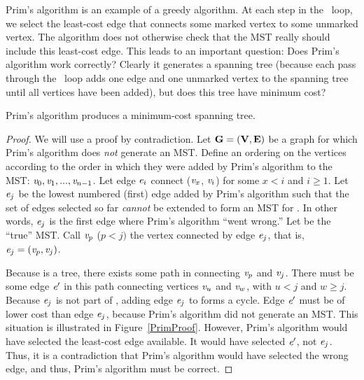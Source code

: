 Prim's algorithm is an example of a greedy
algorithm.
At each step in the \Cfor\ loop, we select the least-cost edge that
connects some marked vertex to some unmarked vertex.
The algorithm does not otherwise check that the MST really should
include this least-cost edge.
This leads to an important question:
Does Prim's algorithm work correctly?
Clearly it generates a spanning tree (because each pass through the
\Cfor\ loop adds one edge and one unmarked vertex to the spanning tree
until all vertices have been added), but does this tree have minimum
cost?

\begin{theorem}
Prim's algorithm produces a minimum-cost spanning tree.
\end{theorem}

\vspace{-\medskipamount}
\begin{proof}
We will use a proof by contradiction.
Let \({\textbf{G}} = ({\textbf{V}}, {\textbf{E}})\) be a graph for which Prim's
algorithm does \emph{not} generate an MST.
Define an ordering on the vertices according to the order in which they
were added by Prim's algorithm to the MST: \({\textit{v}}_0, {\textit{v}}_1,
..., {\textit{v}}_{n-1}\). 
Let edge \({\textit{e}}_i\) connect (\({\textit{v}}_x\), \({\textit{v}}_i\)) for
some \(x < i\) and \(i \geq 1\).
Let \({\textit{e}}_j\) be the lowest numbered (first) edge added
by Prim's algorithm such that the set of edges selected so
far \emph{cannot} be extended to form an MST for .
In other words, \({\textit{e}}_j\) is the first edge where Prim's algorithm
``went wrong.''
Let  be the ``true'' MST.
Call \({\textit{v}}_p\) (\(p<j)\) the vertex connected by edge
\({\textit{e}}_j\), that is, \({\textit{e}}_j = ({\textit{v}}_p, {\textit{v}}_j)\).

Because  is a tree, there exists some path in 
connecting \({\textit{v}}_p\) and \({\textit{v}}_j\).
There must be some edge \({\textit{e}}'\) in this path connecting vertices
\({\textit{v}}_u\) and \({\textit{v}}_w\), with \(u < j\) and \(w \geq j\).
Because \({\textit{e}}_j\) is not part of , adding edge
\({\textit{e}}_j\) to  forms a cycle.
Edge \({\textit{e}}'\) must be of lower cost than
edge \({\textit{e}}_j\), because Prim's algorithm did not generate an MST.
This situation is illustrated in Figure~\ref{PrimProof}.
However, Prim's algorithm would have selected the least-cost edge
available.
It would have selected \({\textit{e}}'\), not \({\textit{e}}_j\).
Thus, it is a contradiction that Prim's algorithm would have selected
the wrong edge, and thus, Prim's algorithm must be correct.
\end{proof}


